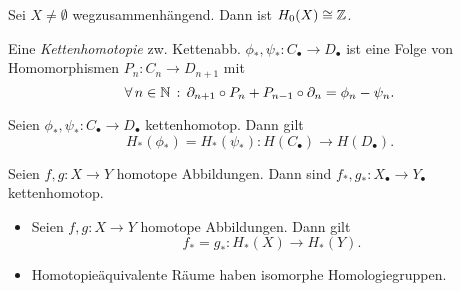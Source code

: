 \documentclass{cheat-sheet}
\newcommand{\CC}[1]{{#1}_{\bullet}} %
\begin{document}
\begin{prop}
  Sei $X \not= \emptyset$ wegzusammenhängend. Dann ist $H_0(X) \cong \mathbb{Z}$.
\end{prop}

\begin{defn}
  Eine \emph{Kettenhomotopie} zw. Kettenabb. $\phi_*, \psi_* : \CC{C} \to \CC{D}$ ist eine Folge von Homomorphismen $P_n : C_n \to D_{n+1}$ mit
  \[ \forall \, {n \in \mathbb{N}} \,:\, \partial_{n+1} \circ P_n + P_{n-1} \circ \partial_n = \phi_n - \psi_n. \]
\end{defn}

\begin{prop}
  Seien $\phi_*, \psi_* : \CC{C} \to \CC{D}$ kettenhomotop. Dann gilt
  \[ H_*(\phi_*) = H_*(\psi_*) : H(\CC{C}) \to H(\CC{D}). \]
\end{prop}

\begin{satz}
  Seien $f, g : X \to Y$ homotope Abbildungen. Dann sind $f_*, g_* : \CC{X} \to \CC{Y}$ kettenhomotop.
\end{satz}

\begin{kor}
  \begin{itemize}
    \item Seien $f, g : X \to Y$ homotope Abbildungen. Dann gilt
    \[ f_* = g_* : H_*(X) \to H_*(Y). \]
    \item Homotopieäquivalente Räume haben isomorphe Homologiegruppen.
  \end{itemize}
\end{kor}


\end{document}
